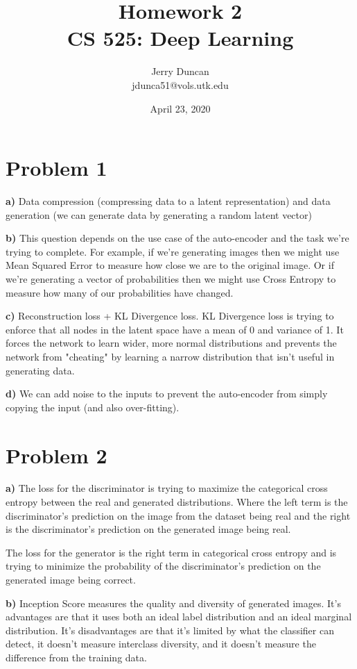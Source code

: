 \documentclass[12pt]{article}
\title{Homework 2 \\\vspace{1em}
\large CS 525: Deep Learning}
\author{
  Jerry Duncan \\
  jdunca51@vols.utk.edu
}
\date{April 23, 2020}
\begin{document}
\maketitle
\pagebreak

\section{Problem 1}

\textbf{a)} Data compression (compressing data to a latent representation) and data generation (we can generate data by generating a random latent vector)

\textbf{b)} This question depends on the use case of the auto-encoder and the task we're trying to complete.
For example, if we're generating images then we might use Mean Squared Error to measure how close we are to the original image.
Or if we're generating a vector of probabilities then we might use Cross Entropy to measure how many of our probabilities have changed.

\textbf{c)} Reconstruction loss + KL Divergence loss.
KL Divergence loss is trying to enforce that all nodes in the latent space have a mean of 0 and variance of 1.
It forces the network to learn wider, more normal distributions and prevents the network from "cheating" by learning a narrow distribution that isn't useful in generating data.

\textbf{d)} We can add noise to the inputs to prevent the auto-encoder from simply copying the input (and also over-fitting).

\section{Problem 2}

\textbf{a)} The loss for the discriminator is trying to maximize the categorical cross entropy between the real and generated distributions.
Where the left term is the discriminator's prediction on the image from the dataset being real and the right is the discriminator's prediction on the generated image being real.

The loss for the generator is the right term in categorical cross entropy and is trying to minimize the probability of the discriminator's prediction on the generated image being correct.

\textbf{b)} Inception Score measures the quality and diversity of generated images.
It's advantages are that it uses both an ideal label distribution and an ideal marginal distribution.
It's disadvantages are that it's limited by what the classifier can detect, it doesn't measure interclass diversity, and it doesn't measure the difference from the training data.
\end{document}
